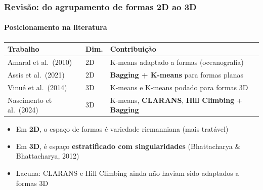 \documentclass[brazilian,11pt]{beamer}
\begin{document}
\begin{frame}[shrink=5]
    \frametitle{Revisão: do agrupamento de formas 2D ao 3D}
    \framesubtitle{Posicionamento na literatura}

    \begin{table}
        \centering
        \footnotesize
        \begin{tabular}{@{}llp{5.6cm}@{}}
            \toprule
            \textbf{Trabalho} & \textbf{Dim.} & \textbf{Contribuição} \\
            \midrule
            Amaral et al.\ (2010) & 2D & K-means adaptado a formas (oceanografia) \\
            Assis et al.\ (2021) & 2D & \textbf{Bagging + K-means} para formas planas \\
            Vinué et al.\ (2014) & 3D & K-means e K-means podado para formas 3D \\
            Nascimento et al.\ (2024) & 3D & K-means, \textbf{CLARANS}, \textbf{Hill Climbing} + \textbf{Bagging} \\
            \bottomrule
        \end{tabular}
    \end{table}

    \begin{itemize}
        \footnotesize
        \item Em \textbf{2D}, o espaço de formas é variedade riemanniana (mais tratável)
        \item Em \textbf{3D}, é espaço \textbf{estratificado com singularidades} (Bhattacharya \& Bhattacharya, 2012)
        \item Lacuna: CLARANS e Hill Climbing ainda não haviam sido adaptados a formas 3D
    \end{itemize}
\end{frame}
\end{document}
